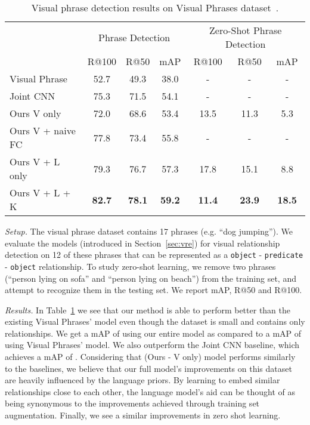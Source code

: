 \documentclass[runningheads]{llncs}
\newcommand{\relationship}[3]{\texttt{#1} - \texttt{#2} - \texttt{#3}}
\newcommand{\eg}[1]{e.g. #1}
\begin{document}
 
\begin{table}[t]
\centering
\small
\caption{Visual phrase detection results on Visual Phrases dataset~\cite{sadeghi2011recognition}.}
\begin{tabular}{l c c c c c c}
                      & \multicolumn{3}{c}{Phrase Detection}  &  \multicolumn{3}{c}{Zero-Shot Phrase Detection}  \\
                     & R@100       & R@50        & mAP         & R@100       & R@50         & mAP \\
  \hline
  \hline
  Visual Phrase \cite{sadeghi2011recognition}
                     & 52.7        & 49.3        & 38.0        & -           & -            & -   \\
  Joint CNN          & 75.3        & 71.5        & 54.1        & -           & -            & -   \\
  \hline
  \hline
Ours V only          & 72.0        & 68.6        & 53.4        & 13.5        & 11.3         & 5.3 \\
Ours  V + naive FC   & 77.8        & 73.4        & 55.8        & -            & -           & -   \\
Ours  V + L only     & 79.3        & 76.7        & 57.3        & 17.8        & 15.1         & 8.8 \\
Ours V + L + K       &\textbf{82.7}&\textbf{78.1}&\textbf{59.2}&\textbf{11.4}&\textbf{23.9}&\textbf{18.5}\\
\hline
\end{tabular}
\label{tab:phrase_results}
\end{table}
 

\textit{Setup.} The visual phrase dataset contains 17 phrases (\eg ``dog jumping''). We evaluate the models (introduced in Section~\ref{sec:vre}) for visual relationship detection on 12 of these phrases that can be represented as a \relationship{object}{predicate}{object} relationship. To study zero-shot learning, we remove two phrases (``person lying on sofa'' and ``person lying on beach'') from the training set, and attempt to recognize them in the testing set. We report mAP, R@50 and R@100.

\textit{Results.} In Table~\ref{tab:phrase_results} we see that our method is able to perform better than the existing Visual Phrases' model even though the dataset is small  and contains only  relationships. We get a mAP of  using our entire model as compared to a mAP of  using Visual Phrases' model. We also outperform the Joint CNN baseline, which achieves a mAP of . Considering that (Ours - V only) model performs similarly to the baselines, we believe that our full model's improvements on this dataset are heavily influenced by the language priors.  By learning to embed similar relationships close to each other, the language model's aid can be thought of as being synonymous to the improvements achieved through training set augmentation. Finally, we see a similar improvements in zero shot learning. 
\end{document}
